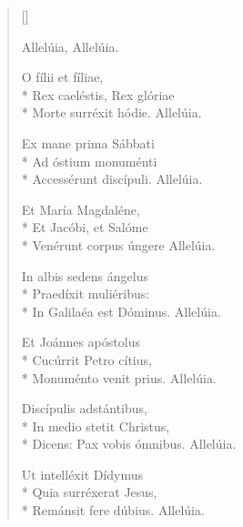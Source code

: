 \newHymn



\settowidth{\versewidth}{Rex caelestis, Rex gloriae}

\begin{verse}[\versewidth]

 Allelúia, Allelúia.

O fílii et fíliae,\\*
Rex caeléstis, Rex glóriae \\*
Morte surréxit hódie.                           
Allelúia.
\pointtrans

Ex mane prima Sábbati \\*
Ad óstium monuménti   \\*  
Accessérunt discípuli.  Allelúia.             

Et María Magdaléne,     \\*
Et Jacóbi, et Salóme    \\*
Venérunt corpus úngere  Allelúia.             

In albis sedens ángelus   \\*
Praedíxit muliéribus:     \\*
In Galilaéa est Dóminus.  Allelúia. 

Et Joánnes apóstolus \\*
Cucúrrit Petro cítius, \\*
Monuménto venit prius. 
                      Allelúia.

Discípulis adstántibus,\\*
In medio stetit Christus,\\*
Dicens: Pax vobis ómnibus. Allelúia. 

Ut intelléxit Dídymus\\*
Quia surréxerat Jesus,    \\*
Remánsit fere dúbius.     Allelúia. 


\end{verse}
